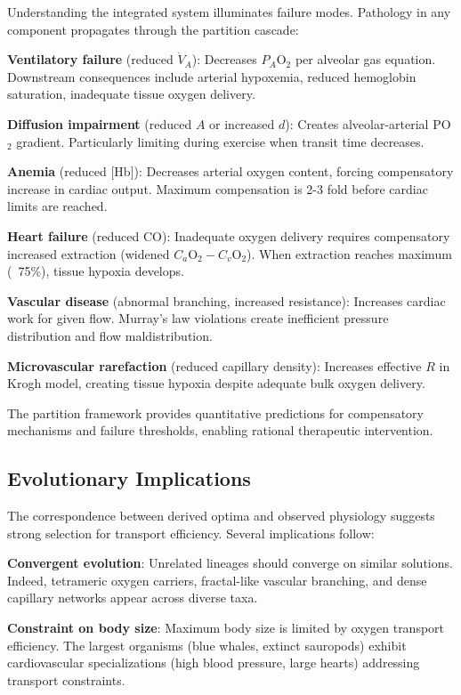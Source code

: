 \documentclass[12pt,a4paper]{article}
\theoremstyle{remark}
\begin{document}
Understanding the integrated system illuminates failure modes. Pathology in any component propagates through the partition cascade:

\textbf{Ventilatory failure} (reduced $\dot{V}_{A}$): Decreases $P_{A}\mathrm{O}_{2}$ per alveolar gas equation. Downstream consequences include arterial hypoxemia, reduced hemoglobin saturation, inadequate tissue oxygen delivery.

\textbf{Diffusion impairment} (reduced $A$ or increased $d$): Creates alveolar-arterial PO$_{2}$ gradient. Particularly limiting during exercise when transit time decreases.

\textbf{Anemia} (reduced [Hb]): Decreases arterial oxygen content, forcing compensatory increase in cardiac output. Maximum compensation is 2-3 fold before cardiac limits are reached.

\textbf{Heart failure} (reduced CO): Inadequate oxygen delivery requires compensatory increased extraction (widened $C_{a}\mathrm{O}_{2} - C_{v}\mathrm{O}_{2}$). When extraction reaches maximum (~75\%), tissue hypoxia develops.

\textbf{Vascular disease} (abnormal branching, increased resistance): Increases cardiac work for given flow. Murray's law violations create inefficient pressure distribution and flow maldistribution.

\textbf{Microvascular rarefaction} (reduced capillary density): Increases effective $R$ in Krogh model, creating tissue hypoxia despite adequate bulk oxygen delivery.

The partition framework provides quantitative predictions for compensatory mechanisms and failure thresholds, enabling rational therapeutic intervention.

\subsection{Evolutionary Implications}

The correspondence between derived optima and observed physiology suggests strong selection for transport efficiency. Several implications follow:

\textbf{Convergent evolution}: Unrelated lineages should converge on similar solutions. Indeed, tetrameric oxygen carriers, fractal-like vascular branching, and dense capillary networks appear across diverse taxa.

\textbf{Constraint on body size}: Maximum body size is limited by oxygen transport efficiency. The largest organisms (blue whales, extinct sauropods) exhibit cardiovascular specializations (high blood pressure, large hearts) addressing transport constraints.
\end{document}
